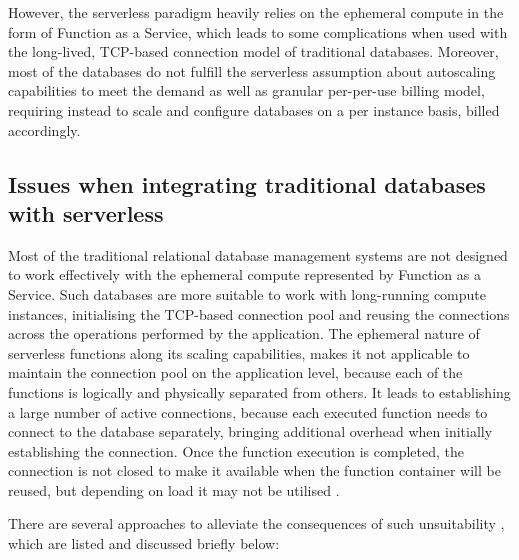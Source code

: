 However, the serverless paradigm heavily relies on the ephemeral compute in the form of Function as a Service, which leads to some complications when used with the long-lived, TCP-based connection model of traditional databases.
Moreover, most of the databases do not fulfill the serverless assumption about autoscaling capabilities to meet the demand as well as granular per-per-use billing model, requiring instead to scale and configure databases on a per instance basis, billed accordingly.

\subsection{Issues when integrating traditional databases with serverless}

Most of the traditional relational database management systems are not designed to work effectively with the ephemeral compute represented by Function as a Service.
Such databases are more suitable to work with long-running compute instances, initialising the TCP-based connection pool and reusing the connections across the operations performed by the application.
The ephemeral nature of serverless functions along its scaling capabilities, makes it not applicable to maintain the connection pool on the application level, because each of the functions is logically and physically separated from others.
It leads to establishing a large number of active connections, because each executed function needs to connect to the database separately, bringing additional overhead when initially establishing the connection.
Once the function execution is completed, the connection is not closed to make it available when the function container will be reused, but depending on load it may not be utilised \cite{WhyThePIETheoremIsMoreRelevantThanTheCAPTheorem}.

There are several approaches to alleviate the consequences of such unsuitability \cite{BuildingResilientServerlessSystemsWithNonServerlessComponents}, which are listed and discussed briefly below:

